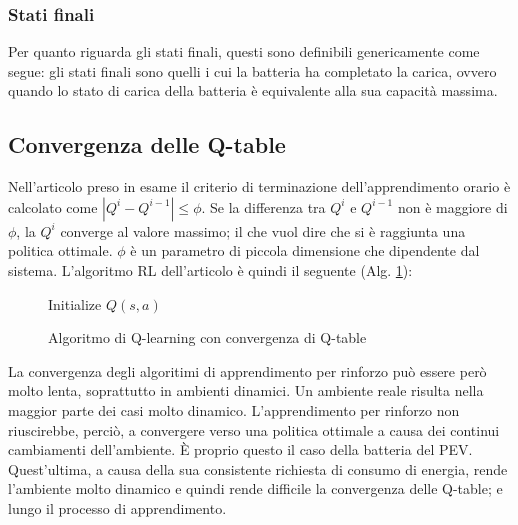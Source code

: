 \documentclass[italian, Lau, oneside]{sapthesis}
\begin{document}
\subsubsection{Stati finali}
Per quanto riguarda gli stati finali, questi sono definibili genericamente come segue: gli stati finali sono quelli i cui la batteria ha completato la carica, ovvero quando lo stato di carica della batteria è equivalente alla sua capacità massima.




\subsection{Convergenza delle Q-table}
Nell'articolo preso in esame il criterio di terminazione dell'apprendimento orario è calcolato come $\left|Q^i-Q^{i-1}\right|\leq \phi$. Se la differenza tra $Q^i$ e $Q^{i-1}$ non è maggiore di $\phi$, la $Q^i$ converge al valore massimo; il che vuol dire che si è raggiunta una politica ottimale. $\phi$ è un parametro di piccola dimensione che dipendente dal sistema. L'algoritmo RL dell'articolo è quindi il seguente (Alg. \ref{alg:1}):

\begin{figure}[ht]
    \centering
    \begin{minipage}{\linewidth}
        \begin{algorithm}[H]
        \label{alg:1}
            \SetAlgoLined
            Initialize $Q(s,a)$\;
            \caption{Algoritmo di Q-learning con convergenza di Q-table}
        \end{algorithm}
    \end{minipage}
\end{figure}

La  convergenza  degli  algoritimi di apprendimento per rinforzo può essere però molto lenta, soprattutto in ambienti dinamici. Un ambiente reale risulta nella maggior parte dei casi molto  dinamico. L’apprendimento  per rinforzo non riuscirebbe, perciò, a convergere verso una politica ottimale a causa dei continui cambiamenti dell’ambiente. È proprio questo il caso della batteria del PEV. Quest'ultima, a causa della sua consistente richiesta di consumo di energia, rende l'ambiente molto dinamico e quindi rende difficile la convergenza delle Q-table; e lungo il processo di apprendimento.
\end{document}
